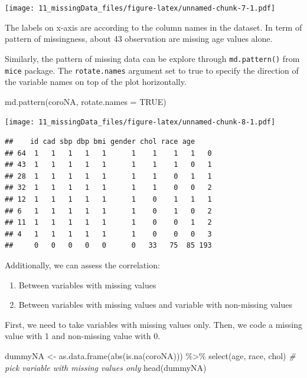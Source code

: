 \documentclass[
  10pt,
]{krantz}
\newenvironment{Shaded}{\begin{snugshade}}{\end{snugshade}}
\newcommand{\AttributeTok}[1]{\textcolor[rgb]{0.77,0.63,0.00}{#1}}
\newcommand{\CommentTok}[1]{\textcolor[rgb]{0.56,0.35,0.01}{\textit{#1}}}
\newcommand{\ConstantTok}[1]{\textcolor[rgb]{0.00,0.00,0.00}{#1}}
\newcommand{\FunctionTok}[1]{\textcolor[rgb]{0.00,0.00,0.00}{#1}}
\newcommand{\NormalTok}[1]{#1}
\newcommand{\OtherTok}[1]{\textcolor[rgb]{0.56,0.35,0.01}{#1}}
\newcommand{\SpecialCharTok}[1]{\textcolor[rgb]{0.00,0.00,0.00}{#1}}
\providecommand{\tightlist}{%
  \setlength{\itemsep}{0pt}\setlength{\parskip}{0pt}}
\begin{document}
\texttt{[image: 11\_missingData\_files/figure-latex/unnamed-chunk-7-1.pdf]}

The labels on x-axis are according to the column names in the dataset. In term of pattern of missingness, about 43 observation are missing age values alone.

Similarly, the pattern of missing data can be explore through \texttt{md.pattern()} from \texttt{mice} package. The \texttt{rotate.names} argument set to true to specify the direction of the variable names on top of the plot horizontally.

\begin{Shaded}
\begin{Highlighting}[]
\FunctionTok{md.pattern}\NormalTok{(coroNA, }\AttributeTok{rotate.names =} \ConstantTok{TRUE}\NormalTok{)}
\end{Highlighting}
\end{Shaded}

\texttt{[image: 11\_missingData\_files/figure-latex/unnamed-chunk-8-1.pdf]}

\begin{verbatim}
##    id cad sbp dbp bmi gender chol race age    
## 64  1   1   1   1   1      1    1    1   1   0
## 43  1   1   1   1   1      1    1    1   0   1
## 28  1   1   1   1   1      1    1    0   1   1
## 32  1   1   1   1   1      1    1    0   0   2
## 12  1   1   1   1   1      1    0    1   1   1
## 6   1   1   1   1   1      1    0    1   0   2
## 11  1   1   1   1   1      1    0    0   1   2
## 4   1   1   1   1   1      1    0    0   0   3
##     0   0   0   0   0      0   33   75  85 193
\end{verbatim}

Additionally, we can assess the correlation:

\begin{enumerate}
\def\labelenumi{\arabic{enumi}.}
\tightlist
\item
  Between variables with missing values
\item
  Between variables with missing values and variable with non-missing values
\end{enumerate}

First, we need to take variables with missing values only. Then, we code a missing value with 1 and non-missing value with 0.

\begin{Shaded}
\begin{Highlighting}[]
\NormalTok{dummyNA }\OtherTok{\textless{}{-}} 
  \FunctionTok{as.data.frame}\NormalTok{(}\FunctionTok{abs}\NormalTok{(}\FunctionTok{is.na}\NormalTok{(coroNA))) }\SpecialCharTok{\%\textgreater{}\%} 
  \FunctionTok{select}\NormalTok{(age, race, chol) }\CommentTok{\# pick variable with missing values only}
\FunctionTok{head}\NormalTok{(dummyNA)}
\end{Highlighting}
\end{Shaded}
\end{document}
